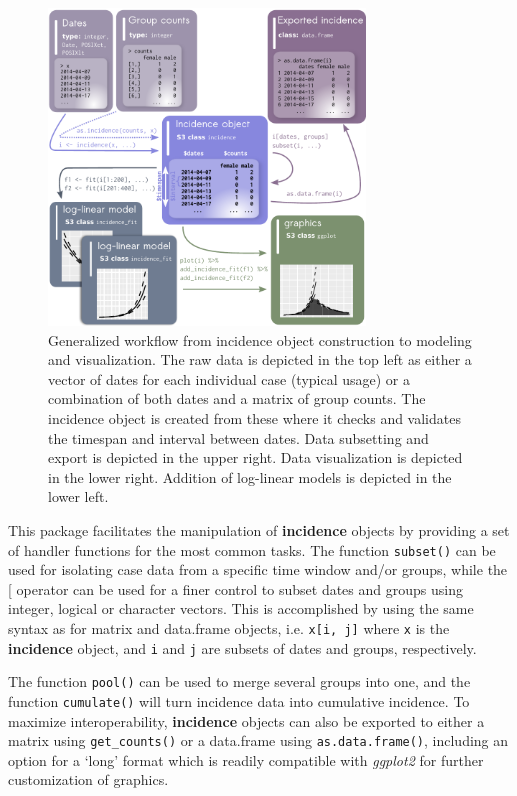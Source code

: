 \documentclass[9pt,a4paper]{extarticle}
\let\cite\citep
\begin{document}
\begin{figure}[h!]
\centering
	\includegraphics[width=0.75\textwidth]{figures/workflow.pdf}
	\caption{\label{fig:workflow}Generalized workflow from incidence object construction to modeling and visualization. 
   	The raw data is depicted in the top left as either a vector of dates for each individual case (typical usage) or a combination of both dates and a matrix of group counts.
    The incidence object is created from these where it checks and validates the timespan and interval between dates. 
    Data subsetting and export is depicted in the upper right. 
    Data visualization is depicted in the lower right.
    Addition of log-linear models is depicted in the lower left.
}
\end{figure}


This package facilitates the manipulation of \textbf{incidence} objects by providing a set of handler functions for the most common tasks.
The function \texttt{subset()} can be used for isolating case data from a specific time window and/or groups, while the {[} operator can be used for a finer control to subset dates and groups using integer, logical or character vectors.
This is accomplished by using the same syntax as for matrix and data.frame objects, i.e. \texttt{x{[i, j]}} where \texttt{x} is the \textbf{incidence} object, and \texttt{i} and \texttt{j} are subsets of dates and groups, respectively.

The function \texttt{pool()} can be used to merge several groups into one, and the function \texttt{cumulate()} will turn incidence data into cumulative incidence.
To maximize interoperability, \textbf{incidence} objects can also be exported to either a matrix using \texttt{get\_counts()} or a data.frame using \texttt{as.data.frame()}, including an option for a `long' format which is readily compatible with \textit{ggplot2} \cite{Wickham2016-pv} for further customization of graphics.
\end{document}

